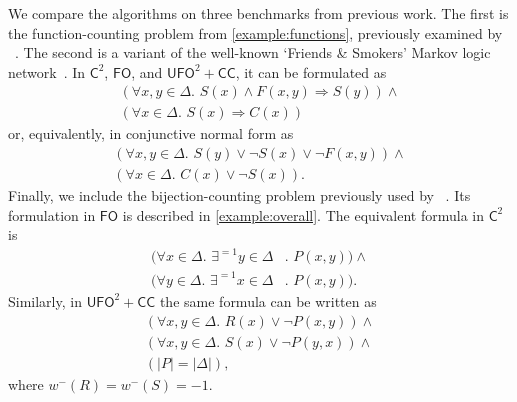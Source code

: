 \documentclass[letterpaper]{article} %
\theoremstyle{remark}
\theoremstyle{definition}
\newcommand{\Ctwo}{$\mathsf{C}^{2}$}
\newcommand{\FO}{$\mathsf{FO}$}
\newcommand{\UFO}{$\mathsf{UFO}^{2} + \mathsf{CC}$}
\begin{document}

We compare the algorithms on three benchmarks from previous work. The first is
the function-counting problem from \cref{example:functions}, previously examined
by \citeauthor{DBLP:conf/kr/DilkasB23}~. The
second is a variant of the well-known `Friends \& Smokers' Markov logic
network~\cite{DBLP:conf/aaai/SinglaD08,DBLP:conf/uai/BroeckCD12}. In \Ctwo{},
\FO{}, and \UFO{}, it can be formulated as
\begin{gather*}
  (\forall x,y \in \Delta\text{. } S(x) \land F(x, y) \Rightarrow S(y)) \land{}\\
  (\forall x \in \Delta\text{. }S(x) \Rightarrow C(x))
\end{gather*}
or, equivalently, in conjunctive normal form as
\begin{gather*}
  (\forall x,y \in \Delta\text{. }S(y) \lor \neg S(x) \lor \neg F(x, y)) \land{}\\
  (\forall x \in \Delta\text{. } C(x) \lor \neg S(x)).
\end{gather*}
Finally, we include the bijection-counting problem previously used by
\citeauthor{DBLP:conf/kr/DilkasB23}~. Its
formulation in \FO{} is described in \cref{example:overall}. The equivalent
formula in \Ctwo{} is
\begin{align*}
  (\forall x \in \Delta\text{. }\exists^{=1} y \in \Delta&\text{. }P(x, y))\land{}\\
  (\forall y \in \Delta\text{. }\exists^{=1} x \in \Delta&\text{. }P(x, y)).
\end{align*}
Similarly, in \UFO{} the same formula can be written as
\begin{gather*}
  (\forall x, y \in \Delta\text{. }R(x) \lor \neg P(x, y))\land{}\\
  (\forall x, y \in \Delta\text{. }S(x) \lor \neg P(y, x))\land{}\\
  (|P| = |\Delta|),
\end{gather*}
where $w^{-}(R) = w^{-}(S) = -1$.
\end{document}
